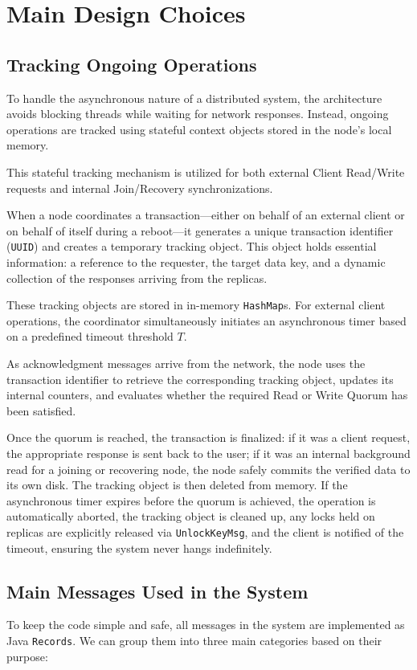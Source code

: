 \section{Main Design Choices}

\subsection{Tracking Ongoing Operations}
To handle the asynchronous nature of a distributed system, the
architecture avoids blocking threads while waiting for network responses.
Instead, ongoing operations are tracked using stateful context objects stored
in the node's local memory.

This stateful tracking mechanism is utilized for both external Client
Read/Write requests and internal Join/Recovery synchronizations.

When a node coordinates a transaction---either on behalf of an external client
or on behalf of itself during a reboot---it generates a unique transaction
identifier (\texttt{UUID}) and creates a temporary tracking object. This object
holds essential information: a reference to the requester, the target data key,
and a dynamic collection of the responses arriving from the replicas.

These tracking objects are stored in in-memory \texttt{HashMap}s. For
external client operations, the coordinator simultaneously initiates an
asynchronous timer based on a predefined timeout threshold $T$.

As acknowledgment messages arrive from the network, the node uses the
transaction identifier to retrieve the corresponding tracking object, updates
its internal counters, and evaluates whether the required Read or Write Quorum
has been satisfied.

Once the quorum is reached, the transaction is finalized: if it was a client
request, the appropriate response is sent back to the user; if it was an
internal background read for a joining or recovering node, the node safely
commits the verified data to its own disk. The tracking object is then deleted
from memory. If the asynchronous timer expires before the quorum is achieved,
the operation is automatically aborted, the tracking object is cleaned up,
any locks held on replicas are explicitly released via \texttt{UnlockKeyMsg},
and the client is notified of the timeout, ensuring the system never hangs
indefinitely.

\subsection{Main Messages Used in the System}
To keep the code simple and safe, all messages in the system are implemented as
Java \texttt{Records}. We can group them into three main categories based on
their purpose:


